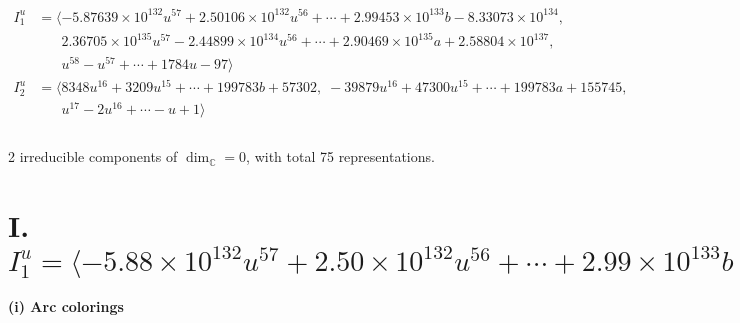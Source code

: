 \documentclass[1p]{elsarticle_modified}
\theoremstyle{definition}
\begin{document}
\begin{align*}
I^u_{1}&=\langle 
-5.87639\times10^{132} u^{57}+2.50106\times10^{132} u^{56}+\cdots+2.99453\times10^{133} b-8.33073\times10^{134},\\
\phantom{I^u_{1}}&\phantom{= \langle  }2.36705\times10^{135} u^{57}-2.44899\times10^{134} u^{56}+\cdots+2.90469\times10^{135} a+2.58804\times10^{137},\\
\phantom{I^u_{1}}&\phantom{= \langle  }u^{58}- u^{57}+\cdots+1784 u-97\rangle \\
I^u_{2}&=\langle 
8348 u^{16}+3209 u^{15}+\cdots+199783 b+57302,\;-39879 u^{16}+47300 u^{15}+\cdots+199783 a+155745,\\
\phantom{I^u_{2}}&\phantom{= \langle  }u^{17}-2 u^{16}+\cdots- u+1\rangle \\
\\
\end{align*}
\raggedright * 2 irreducible components of $\dim_{\mathbb{C}}=0$, with total 75 representations.\\
\newpage
\renewcommand{\arraystretch}{1}
\centering \section*{I. $I^u_{1}= \langle -5.88\times10^{132} u^{57}+2.50\times10^{132} u^{56}+\cdots+2.99\times10^{133} b-8.33\times10^{134},\;2.37\times10^{135} u^{57}-2.45\times10^{134} u^{56}+\cdots+2.90\times10^{135} a+2.59\times10^{137},\;u^{58}- u^{57}+\cdots+1784 u-97 \rangle$}
\flushleft \textbf{(i) Arc colorings}\\
\end{document}
